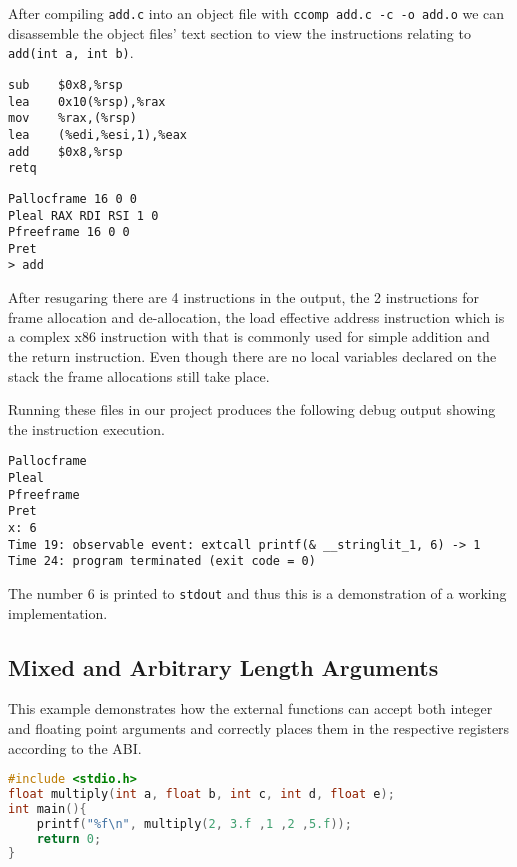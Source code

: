 After compiling \texttt{add.c} into an object file with \lstinline{ccomp add.c -c -o add.o} we can disassemble the object files' text section to view the instructions relating to \lstinline{add(int a, int b)}.


\begin{multicols}{2}
\begin{minipage}{0.5\textwidth}
\begin{lstlisting}[language=x86-64, caption=add.o disassembly]
sub    $0x8,%rsp
lea    0x10(%rsp),%rax
mov    %rax,(%rsp)
lea    (%edi,%esi,1),%eax
add    $0x8,%rsp
retq   
\end{lstlisting}
\end{minipage}
\begin{lstlisting}[caption=Output of disassembly wrapper]
Pallocframe 16 0 0
Pleal RAX RDI RSI 1 0
Pfreeframe 16 0 0
Pret
> add
\end{lstlisting}
\end{multicols}

After resugaring there are 4 instructions in the output, the 2 instructions for frame allocation and de-allocation, the load effective address instruction which is a complex x86 instruction with that is commonly used for simple addition and the return instruction. Even though there are no local variables declared on the stack the frame allocations still take place.

Running these files in our project produces the following debug output showing the instruction execution.

\begin{lstlisting}[frame=lrtb, numbers=none, caption=\texttt{\$ ccomp -interp add.c -link add.o}]
Pallocframe
Pleal
Pfreeframe
Pret
x: 6
Time 19: observable event: extcall printf(& __stringlit_1, 6) -> 1
Time 24: program terminated (exit code = 0)
\end{lstlisting}

The number 6 is printed to \lstinline{stdout} and thus this is a demonstration of a working implementation.

\subsection{Mixed and Arbitrary Length Arguments}
This example demonstrates how the external functions can accept both integer and floating point arguments and correctly places them in the respective registers according to the ABI.

\begin{lstlisting}[language=C, caption=call\_mixed.c]
#include <stdio.h>
float multiply(int a, float b, int c, int d, float e);
int main(){
    printf("%f\n", multiply(2, 3.f ,1 ,2 ,5.f));
    return 0;
}
\end{lstlisting}

